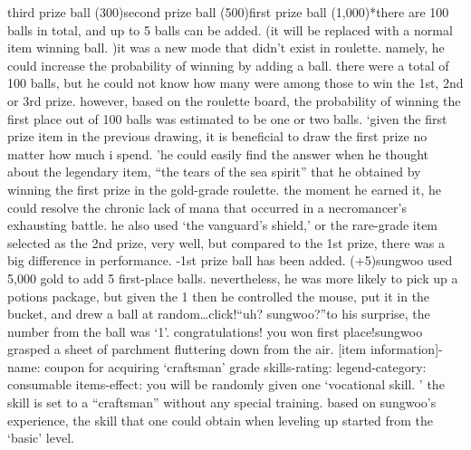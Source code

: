 third prize ball (300)second prize ball (500)first prize ball (1,000)*there are 100 balls in total, and up to 5 balls can be added.
 (it will be replaced with a normal item winning ball.
)it was a new mode that didn’t exist in roulette.
 namely, he could increase the probability of winning by adding a ball.
 there were a total of 100 balls, but he could not know how many were among those to win the 1st, 2nd or 3rd prize.
 however, based on the roulette board, the probability of winning the first place out of 100 balls was estimated to be one or two balls.
‘given the first prize item in the previous drawing, it is beneficial to draw the first prize no matter how much i spend.
’he could easily find the answer when he thought about the legendary item, “the tears of the sea spirit” that he obtained by winning the first prize in the gold-grade roulette.
the moment he earned it, he could resolve the chronic lack of mana that occurred in a necromancer’s exhausting battle.
 he also used ‘the vanguard’s shield,’ or the rare-grade item selected as the 2nd prize, very well, but compared to the 1st prize, there was a big difference in performance.
-1st prize ball has been added.
 (+5)sungwoo used 5,000 gold to add 5 first-place balls.
 nevertheless, he was more likely to pick up a potions package, but given the 1%
 then he controlled the mouse, put it in the bucket, and drew a ball at random…click!“uh? sungwoo?”to his surprise, the number from the ball was ‘1’.
congratulations! you won first place!sungwoo grasped a sheet of parchment fluttering down from the air.
[item information]-name: coupon for acquiring ‘craftsman’ grade skills-rating: legend-category: consumable items-effect: you will be randomly given one ‘vocational skill.
’ the skill is set to a “craftsman” without any special training.
based on sungwoo’s experience, the skill that one could obtain when leveling up started from the ‘basic’ level.


 